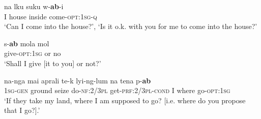 \documentclass[output=paper]{langsci/langscibook}
\begin{document}
\begin{exe}
	\ex \label{ex:ar10}
	\gll na 	lku 	suku w-\textbf{ab}-i\\
	I house	inside come-\textsc{opt}:1\textsc{sg}-\textsc{q}\\
	\trans ‘Can I come into the house?’, ‘Is it o.k. with you for me to come into the house?’
\end{exe} 

\begin{exe}
	\ex \label{ex:ar11}
	\gll s-\textbf{ab} mola mol\\
	give-\textsc{opt}:1\textsc{sg} or no\\
	\trans ‘Shall I give [it to you] or not?’
\end{exe}

\begin{exe}
	\ex \label{ex:ar12}
	\gll na-nga mai aprali te-k lyi-ng-lum na tena p-\textbf{ab}\\
	1\textsc{sg}-\textsc{gen} ground seize do-\textsc{nf}:2/3\textsc{pl} get-\textsc{prf}:2/3\textsc{pl}-\textsc{cond} I where go-\textsc{opt}:1\textsc{sg}\\
	\trans ‘If they take my land, where I am supposed to go? [i.e. where do you propose that I go?].’
\end{exe}
\end{document}
